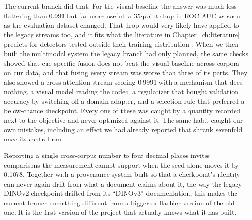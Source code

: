 The current branch did that. For the visual baseline the answer was much less
flattering than 0.999 but far more useful: a 35-point drop in ROC AUC as soon
as the evaluation dataset changed. That drop would very likely have applied to
the legacy streams too, and it fits what the literature in
Chapter~\ref{ch:literature} predicts for detectors tested outside their
training distribution \cite{ramanaharan2025, coccomini2022}. When we then built
the multimodal system the legacy branch had only planned, the same checks
showed that cue-specific fusion does not beat the visual baseline across
corpora on our data, and that fusing every stream was worse than three of its
parts. They also showed a cross-attention stream scoring 0.9991 with a
mechanism that does nothing, a visual model reading the codec, a regularizer
that bought validation accuracy by switching off a domain adapter, and a
selection rule that preferred a below-chance checkpoint. Every one of these was
caught by a quantity recorded next to the objective and never optimized
against it. The same habit caught our own mistakes, including an effect we had
already reported that shrank sevenfold once its control ran.

Reporting a single cross-corpus number to four decimal places invites
comparisons the measurement cannot support when the seed alone moves it by
0.1078. Together with a provenance system built so that a checkpoint's identity
can never again drift from what a document claims about it, the way the
legacy DINOv2 checkpoint drifted from its ``DINOv3'' documentation, this makes
the current branch something different from a bigger or flashier version of the
old one. It is the first version of the project that actually knows what it has
built.




